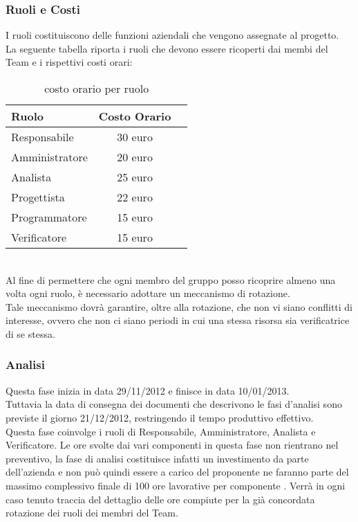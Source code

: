 \subsubsection{Ruoli e Costi}
I ruoli  costituiscono delle funzioni aziendali che vengono assegnate al progetto.\\
La seguente tabella riporta i ruoli che devono essere ricoperti dai membi del Team e i rispettivi costi orari:
\begin{table}[h]
\centering
\begin{tabular}{|l|cl|}
\hline
Ruolo& Costo Orario&  \\
\hline
Responsabile & 30 euro &\\
Amministratore  & 20 euro&\\
Analista & 25 euro&\\
Progettista  & 22 euro&\\
Programmatore & 15 euro&\\
Verificatore & 15 euro&\\
\hline
\end{tabular}
\caption{costo orario per ruolo}
\end{table}\\
Al fine di permettere che ogni membro del gruppo posso ricoprire almeno una volta ogni ruolo, è necessario adottare un meccanismo di rotazione.\\
Tale meccanismo dovrà garantire, oltre alla rotazione, che non vi siano conflitti di interesse, ovvero che non ci siano periodi in cui una stessa risorsa sia verificatrice di se stessa.\\

\subsubsection{Analisi}
Questa fase inizia in data 29/11/2012 e finisce in data 10/01/2013.\\
Tuttavia la data di consegna dei documenti che descrivono le fasi d'analisi sono previste il giorno 21/12/2012, restringendo il tempo produttivo effettivo.\\
Questa fase coinvolge i ruoli di Responsabile, Amministratore, Analista e Verificatore.
Le ore svolte dai vari componenti in questa fase non rientrano nel preventivo, la fase di analisi costituisce infatti un investimento da parte dell’azienda e non può quindi essere a carico del proponente ne faranno parte del massimo complessivo finale di 100 ore lavorative per componente .
Verrà in ogni caso tenuto traccia del dettaglio delle ore compiute per la già concordata rotazione dei ruoli dei membri del Team.

